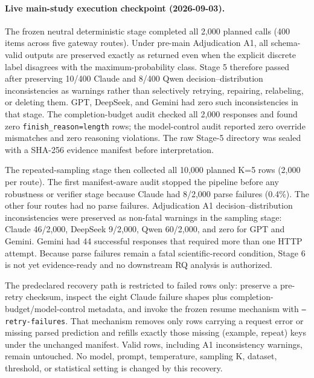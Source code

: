 
\paragraph{Live main-study execution checkpoint (2026-09-03).}
The frozen neutral deterministic stage completed all 2,000 planned calls (400 items across five gateway routes). Under pre-main Adjudication A1, all schema-valid outputs are preserved exactly as returned even when the explicit discrete label disagrees with the maximum-probability class. Stage 5 therefore passed after preserving 10/400 Claude and 8/400 Qwen decision--distribution inconsistencies as warnings rather than selectively retrying, repairing, relabeling, or deleting them. GPT, DeepSeek, and Gemini had zero such inconsistencies in that stage. The completion-budget audit checked all 2,000 responses and found zero \texttt{finish\_reason=length} rows; the model-control audit reported zero override mismatches and zero reasoning violations. The raw Stage-5 directory was sealed with a SHA-256 evidence manifest before interpretation.

The repeated-sampling stage then collected all 10,000 planned K=5 rows (2,000 per route). The first manifest-aware audit stopped the pipeline before any robustness or verifier stage because Claude had 8/2,000 parse failures (0.4\%). The other four routes had no parse failures. Adjudication A1 decision--distribution inconsistencies were preserved as non-fatal warnings in the sampling stage: Claude 46/2,000, DeepSeek 9/2,000, Qwen 60/2,000, and zero for GPT and Gemini. Gemini had 44 successful responses that required more than one HTTP attempt. Because parse failures remain a fatal scientific-record condition, Stage 6 is not yet evidence-ready and no downstream RQ analysis is authorized.

The predeclared recovery path is restricted to failed rows only: preserve a pre-retry checksum, inspect the eight Claude failure shapes plus completion-budget/model-control metadata, and invoke the frozen resume mechanism with \texttt{--retry-failures}. That mechanism removes only rows carrying a request error or missing parsed prediction and refills exactly those missing (example, repeat) keys under the unchanged manifest. Valid rows, including A1 inconsistency warnings, remain untouched. No model, prompt, temperature, sampling K, dataset, threshold, or statistical setting is changed by this recovery.
